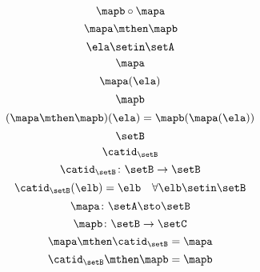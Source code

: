 \begin{forslides}
    \begin{equation}
        \label{eq:slides_session2_134}
        \mapb \circ \mapa
    \end{equation}
    \begin{equation}
        \label{eq:slides_session2_135}
        \mapa \mthen \mapb
    \end{equation}
    \begin{equation}
        \label{eq:slides_session2_136}
        \ela \setin\setA
    \end{equation}
    \begin{equation}
        \label{eq:slides_session2_137}
        \mapa
    \end{equation}
    \begin{equation}
        \label{eq:slides_session2_138}
        \mapa(\ela)
    \end{equation}
    \begin{equation}
        \label{eq:slides_session2_139}
        \mapb
    \end{equation}
    \begin{equation}
        \label{eq:slides_session2_140}
        (\mapa \mthen \mapb)(\ela) = \mapb(\mapa(\ela))
    \end{equation}
    \begin{equation}
        \label{eq:slides_session2_141}
        \setB
    \end{equation}
    \begin{equation}
        \label{eq:slides_session2_142}
        \catid_\setB
    \end{equation}
    \begin{equation}
        \label{eq:slides_session2_142a}
        \catid_\setB \colon \setB \to \setB
    \end{equation}
    \begin{equation}
        \label{eq:slides_session2_143}
        \catid_\setB(\elb) = \elb \quad \forall  \elb \setin\setB
    \end{equation}
    \begin{equation}
        \label{eq:slides_session2_144}
        \mapa \colon \setA \sto \setB
    \end{equation}
    \begin{equation}
        \label{eq:slides_session2_145}
        \mapb \colon \setB \to \setC
    \end{equation}
    \begin{equation}
        \label{eq:slides_session2_146}
        \mapa \mthen \catid_\setB = \mapa
    \end{equation}
    \begin{equation}
        \label{eq:slides_session2_147}
        \catid_\setB \mthen \mapb = \mapb
    \end{equation}


\end{forslides}
